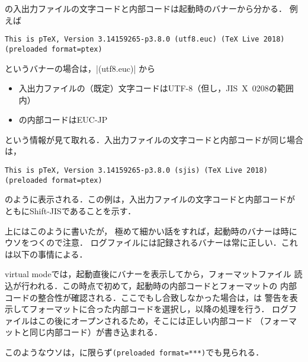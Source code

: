 \documentclass[a4paper,11pt,nomag,dvipdfmx]{jsarticle}
\def\code#1{\texttt{#1}}
\begin{document}
\pTeX の入出力ファイルの文字コードと内部コードは起動時のバナーから分かる．
例えば
\begin{verbatim}
This is pTeX, Version 3.14159265-p3.8.0 (utf8.euc) (TeX Live 2018)
(preloaded format=ptex)
\end{verbatim}
というバナーの場合は，|(utf8.euc)| から
\begin{itemize}
 \item 入出力ファイルの（既定）文字コードはUTF-8（但し，JIS~X~0208の範囲内）
 \item \pTeX の内部コードはEUC-JP
\end{itemize}
という情報が見て取れる．入出力ファイルの文字コードと内部コードが同じ場合は，
\begin{verbatim}
This is pTeX, Version 3.14159265-p3.8.0 (sjis) (TeX Live 2018)
(preloaded format=ptex)
\end{verbatim}
のように表示される．この例は，入出力ファイルの文字コードと内部コードが
ともにShift-JISであることを示す．

\begin{dangerous}
上にはこのように書いたが，
極めて細かい話をすれば，起動時のバナーは時にウソをつくので注意．
ログファイルには記録されるバナーは常に正しい．これは以下の事情による．

virtual modeでは，起動直後にバナーを表示してから，フォーマットファイル
読込が行われる．この時点で初めて，起動時の内部コードとフォーマットの
内部コードの整合性が確認される．ここでもし合致しなかった場合は，\pTeX は
警告を表示してフォーマットに合った内部コードを選択し，以降の処理を行う．
ログファイルはこの後にオープンされるため，そこには正しい内部コード
（フォーマットと同じ内部コード）が書き込まれる\cite{tjb55}．

このようなウソは，\pTeX に限らず\code{(preloaded format=***)}でも見られる．
\end{dangerous}
\end{document}
